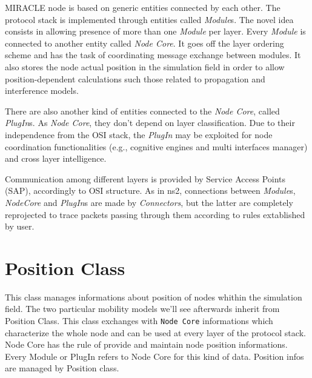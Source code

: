 \documentclass[a4paper,10pt]{article}
\begin{document}
MIRACLE node is based on generic entities connected by each other. The protocol stack is implemented through entities called \emph{Module}s. The novel idea consists in allowing presence of more than one \emph{Module} per layer. Every \emph{Module} is connected to another entity called \emph{Node Core}. It goes off the layer ordering scheme and has the task of coordinating message exchange between modules. It also stores the node actual position in the simulation field in order to allow position-dependent calculations such those related to propagation and interference models.

There are also another kind of entities connected to the \emph{Node Core}, called \emph{PlugIn}s. As \emph{Node Core}, they don't depend on layer classification. Due to their independence from the OSI stack, the \emph{PlugIn} may be exploited for node coordination functionalities (e.g., cognitive engines and multi interfaces manager) and cross layer intelligence.

Communication among different layers is provided by Service Access Points (SAP), accordingly to OSI structure.
As in ns2, connections between \emph{Module}s, \emph{NodeCore} and \emph{PlugIn}s are made by \emph{Connectors}, but the latter are completely reprojected to trace packets passing through them according to rules extablished by user.



\section{Position Class}

This class manages informations about position of nodes whithin the simulation field. The two particular mobility models we'll see afterwards inherit from Position Class. This class exchanges with \verb=Node Core= informations which characterize the whole node and can be used at every layer of the protocol stack.
Node Core has the rule of provide and maintain node position informations. Every Module or PlugIn refers to Node Core for this kind of data. Position infos are managed by Position class.
\end{document}
